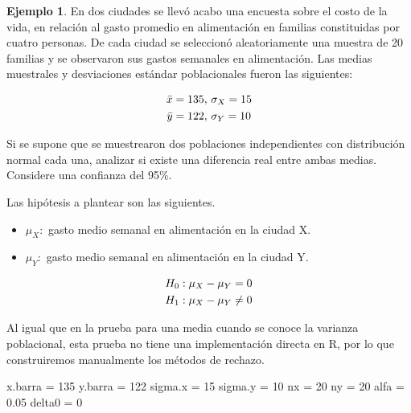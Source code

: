 \documentclass[
  11pt,
]{book}
\newenvironment{Shaded}{\begin{snugshade}}{\end{snugshade}}
\newcommand{\DecValTok}[1]{\textcolor[rgb]{0.00,0.00,0.81}{#1}}
\newcommand{\FloatTok}[1]{\textcolor[rgb]{0.00,0.00,0.81}{#1}}
\newcommand{\NormalTok}[1]{#1}
\newcommand{\OtherTok}[1]{\textcolor[rgb]{0.56,0.35,0.01}{#1}}
\providecommand{\tightlist}{%
  \setlength{\itemsep}{0pt}\setlength{\parskip}{0pt}}
\theoremstyle{definition}
\theoremstyle{definition}
\newtheorem{example}{Ejemplo}[chapter]
\theoremstyle{definition}
\theoremstyle{definition}
\theoremstyle{remark}
\begin{document}
\begin{example}

En dos ciudades se llevó acabo una encuesta sobre el costo de la vida, en relación al gasto promedio en alimentación en familias constituidas por cuatro personas. De cada ciudad se seleccionó aleatoriamente una muestra de 20 familias y se observaron sus gastos semanales en alimentación. Las medias muestrales y desviaciones estándar poblacionales fueron las siguientes:

\begin{equation}
\notag
\begin{split}
\bar{x} = 135, & \text{ } \sigma_X = 15\\
\bar{y} = 122, & \text{ } \sigma_Y = 10
\end{split}
\end{equation}

Si se supone que se muestrearon dos poblaciones independientes con distribución normal cada una, analizar si existe una diferencia real entre ambas medias. Considere una confianza del 95\%.

Las hipótesis a plantear son las siguientes.

\begin{itemize}
\tightlist
\item
  \(\mu_X:\) gasto medio semanal en alimentación en la ciudad X.
\item
  \(\mu_Y:\) gasto medio semanal en alimentación en la ciudad Y.
\end{itemize}

\begin{equation}
\notag
  \begin{split}
    H_0&: \mu_{X} - \mu_{Y} = 0\\
    H_1&: \mu_{X} - \mu_{Y} \neq 0\\
  \end{split}
\end{equation}

Al igual que en la prueba para una media cuando se conoce la varianza poblacional, esta prueba no tiene una implementación directa en R, por lo que construiremos manualmente los métodos de rechazo.

\begin{Shaded}
\begin{Highlighting}[]
\NormalTok{x.barra }\OtherTok{=} \DecValTok{135}
\NormalTok{y.barra }\OtherTok{=} \DecValTok{122}
\NormalTok{sigma.x }\OtherTok{=} \DecValTok{15}
\NormalTok{sigma.y }\OtherTok{=} \DecValTok{10}
\NormalTok{nx }\OtherTok{=} \DecValTok{20}
\NormalTok{ny }\OtherTok{=} \DecValTok{20}
\NormalTok{alfa }\OtherTok{=} \FloatTok{0.05}
\NormalTok{delta0 }\OtherTok{=} \DecValTok{0}
\end{Highlighting}
\end{Shaded}


\end{example}
\end{document}
